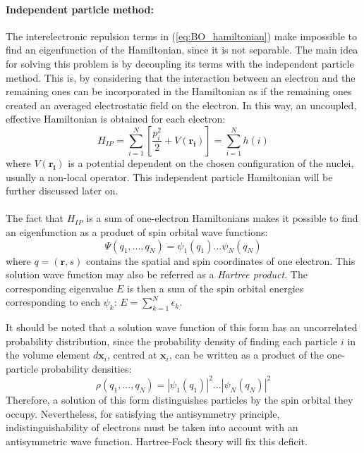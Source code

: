 \paragraph{Independent particle method:}
The interelectronic repulsion terms in (\ref{eq:BO_hamiltonian}) make impossible to find an eigenfunction of the Hamiltonian, since it is not separable. The main idea for solving this problem is by decoupling its terms with the independent particle method. This is, by considering that the interaction between an electron and the remaining ones can be incorporated in the Hamiltonian as if the remaining ones created an averaged electrostatic field on the electron. In this way, an uncoupled, effective Hamiltonian is obtained for each electron:
\begin{equation}
    H_{IP}=\sum_{i=1}^N\left[\frac{p_i^2}{2}+V(\mathbf{r_i})\right]=\sum_{i=1}^N h(i)
    \label{eq:IP_hamiltonian}
\end{equation}
where $V(\mathbf{r_i})$ is a potential dependent on the chosen configuration of the nuclei, usually a non-local operator. This independent particle Hamiltonian will be further discussed later on.\\\\
The fact that $H_{IP}$ is a sum of one-electron Hamiltonians makes it possible to find an eigenfunction as a product of spin orbital wave functions:
\begin{equation}
	\Psi (q_1,...,q_N) = \psi_1(q_1)... \psi_N(q_N)
	\label{eq:prod_spinorbitals}
\end{equation}
where $q = (\mathbf{r},s)$ contains the spatial and spin coordinates of one electron. This solution wave function may also be referred as a \emph{Hartree product}. The corresponding eigenvalue $E$ is then a sum of the spin orbital energies corresponding to each $\psi_k$: $E = \sum_{k=1}^N\epsilon_k$. 

It should be noted that a solution wave function of this form has an uncorrelated probability distribution, since the probability density of finding each particle $i$ in the volume element $d\mathbf{x}_i$, centred at $\mathbf{x}_i$, can be written as a product of the one-particle probability densities:
\begin{equation}
	\rho (q_1,...,q_N) = \left|\psi_1(q_1)\right|^2... \left|\psi_N(q_N)\right|^2
	\label{eq:prob_density}
\end{equation}
Therefore, a solution of this form distinguishes particles by the spin orbital they occupy. Nevertheless, for satisfying the antisymmetry principle, indistinguishability of electrons must be taken into account with an antisymmetric wave function. Hartree-Fock theory will fix this deficit.

